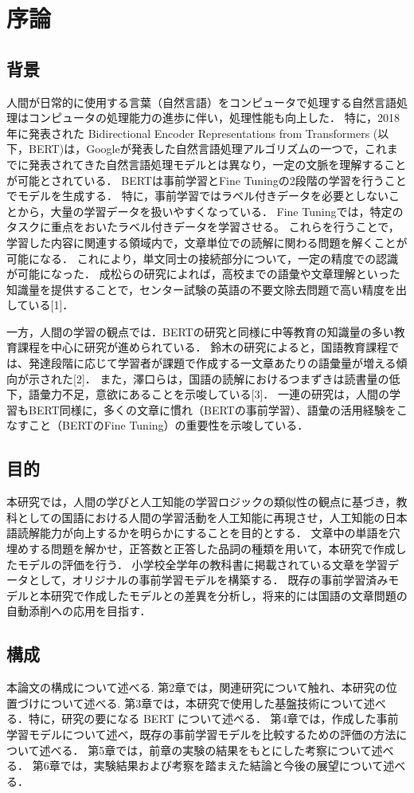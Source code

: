 \chapter{序論\label{cI}}

\section{背景}
人間が日常的に使用する言葉（自然言語）をコンピュータで処理する自然言語処理はコンピュータの処理能力の進歩に伴い，処理性能も向上した．
特に，2018年に発表された Bidirectional Encoder Representations from Transformers (以下，BERT)は，Googleが発表した自然言語処理アルゴリズムの一つで，これまでに発表されてきた自然言語処理モデルとは異なり，一定の文脈を理解することが可能とされている．
BERTは事前学習とFine Tuningの2段階の学習を行うことでモデルを生成する．
特に，事前学習ではラベル付きデータを必要としないことから，大量の学習データを扱いやすくなっている．
Fine Tuningでは，特定のタスクに重点をおいたラベル付きデータを学習させる。
これらを行うことで，学習した内容に関連する領域内で，文章単位での読解に関わる問題を解くことが可能になる．
これにより，単文同士の接続部分について，一定の精度での認識が可能になった．
成松らの研究によれば，高校までの語彙や文章理解といった知識量を提供することで，センター試験の英語の不要文除去問題で高い精度を出している[1]．\par
一方，人間の学習の観点では．BERTの研究と同様に中等教育の知識量の多い教育課程を中心に研究が進められている．
鈴木の研究によると，国語教育課程では、発達段階に応じて学習者が課題で作成する一文章あたりの語彙量が増える傾向が示された[2]．
また，澤口らは，国語の読解におけるつまずきは読書量の低下，語彙力不足，意欲にあることを示唆している[3]．
一連の研究は，人間の学習もBERT同様に，多くの文章に慣れ（BERTの事前学習）、語彙の活用経験をこなすこと（BERTのFine Tuning）の重要性を示唆している．

\section{目的}
本研究では，人間の学びと人工知能の学習ロジックの類似性の観点に基づき，教科としての国語における人間の学習活動を人工知能に再現させ，人工知能の日本語読解能力が向上するかを明らかにすることを目的とする．
文章中の単語を穴埋めする問題を解かせ，正答数と正答した品詞の種類を用いて，本研究で作成したモデルの評価を行う．
小学校全学年の教科書に掲載されている文章を学習データとして，オリジナルの事前学習モデルを構築する．
既存の事前学習済みモデルと本研究で作成したモデルとの差異を分析し，将来的には国語の文章問題の自動添削への応用を目指す．

\section{構成}
本論文の構成について述べる.
第2章では，関連研究について触れ、本研究の位置づけについて述べる.
第3章では，本研究で使用した基盤技術について述べる．特に，研究の要になる BERT について述べる．
第4章では，作成した事前学習モデルについて述べ，既存の事前学習モデルを比較するための評価の方法について述べる．
第5章では，前章の実験の結果をもとにした考察について述べる．
第6章では，実験結果および考察を踏まえた結論と今後の展望について述べる．
